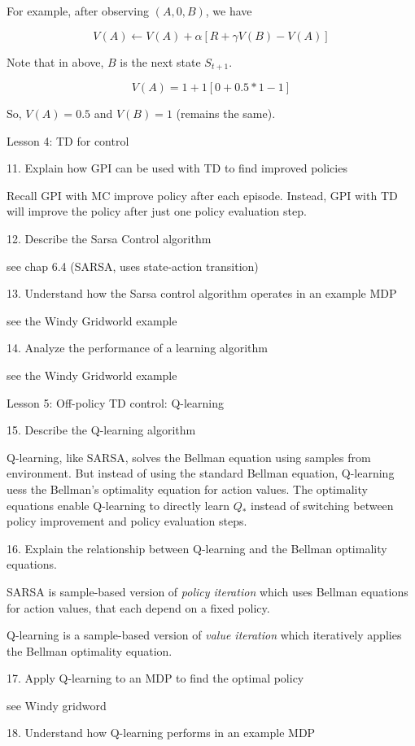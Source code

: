 \documentclass[sutton_barto_notes.tex]{subfiles}
\begin{document}
For example, after observing $(A, 0, B)$, we have

$$V(A) \leftarrow V(A) + \alpha [R + \gamma V(B) - V(A)]$$

Note that in above, $B$ is the next state $S_{t+1}$.

$$V(A) = 1 + 1 [0 + 0.5 * 1 - 1]$$

So, $V(A) = 0.5$ and $V(B) = 1$ (remains the same).

Lesson 4: TD for control

11. Explain how GPI can be used with TD to find improved policies

Recall GPI with MC improve policy after each episode. Instead,
GPI with TD will improve the policy after just one policy evaluation step.

12. Describe the Sarsa Control algorithm

see chap 6.4 (SARSA, uses state-action transition)

13. Understand how the Sarsa control algorithm operates in an example MDP

see the Windy Gridworld example

14. Analyze the performance of a learning algorithm

see the Windy Gridworld example

Lesson 5: Off-policy TD control: Q-learning

15. Describe the Q-learning algorithm

Q-learning, like SARSA, solves the Bellman equation using samples from environment. But instead of using the standard Bellman equation, Q-learning uess the Bellman's optimality equation for action values. The optimality equations enable Q-learning to directly learn $Q_*$ instead of switching between policy improvement and policy evaluation steps.

16. Explain the relationship between Q-learning and the Bellman optimality equations.

SARSA is sample-based version of \textit{policy iteration} which uses Bellman equations for action values, that each depend on a fixed policy.

Q-learning is a sample-based version of \textit{value iteration} which iteratively applies the Bellman optimality equation.

17. Apply Q-learning to an MDP to find the optimal policy

see Windy gridword

18. Understand how Q-learning performs in an example MDP
\end{document}

